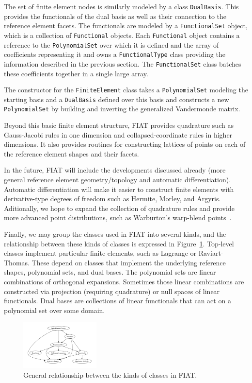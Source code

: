 The set of finite element nodes is similarly modeled by a class
\texttt{DualBasis}.  This provides the functionals of the dual basis
as well as their connection to the reference element facets.
The functionals are modeled by a \texttt{FunctionalSet} object, which
is a collection of \texttt{Functional} objects.
Each \texttt{Functional} object contains a
reference to the \texttt{PolynomialSet} over which it is defined and
the array of coefficients representing it and owns a
\texttt{FunctionalType} class providing the information described in
the previous section.  The
\texttt{FunctionalSet} class batches these coefficients together in a
single large array.

The constructor for the \texttt{FiniteElement} class takes a
\texttt{PolynomialSet} modeling the starting basis and a
\texttt{DualBasis} defined over this basis and constructs a new
\texttt{PolynomialSet} by building and inverting the generalized
Vandermonde matrix.

Beyond this basic finite element structure, FIAT provides quadrature
such as Gauss-Jacobi rules in one dimension and
collapsed-coordinate rules in higher dimensions.  It also provides
routines for constructing lattices of points on each of the reference
element shapes and their facets.

In the future, FIAT will include the developments discussed already
(more general reference element geometry/topology and automatic
differentiation).  Automatic differentiation will make it easier to
construct finite elements with deriva\-tive-type degrees of freedom such
as Hermite, Morley, and Argyris.  Aditionally,
we hope to expand the collection of quadrature
rules and provide more advanced point distributions, such as
Warburton's warp-blend points~\cite{War05}.

Finally, we may group the classes used in FIAT into several kinds, and
the relationship between these kinds of classes is expressed in Figure~\ref{fig:struct}.
Top-level classes implement particular finite elements, such as
Lagrange or Raviart-Thomas.  These depend on classes that implement
the underlying reference shapes, polynomial sets, and dual bases.  The
polynomial sets are linear combinations of orthogonal expansions.
Sometimes those linear combinations are constructed via projection
(requiring quadrature) or null spaces of linear functionals.
Dual bases are collections of linear functionals that can act on a
polynomial set over some domain.

\begin{figure}[h]
  \label{fig:struct}
  \begin{center}
    \includegraphics[width=4cm]{chapters/kirby-2/pdf/struct.pdf}
    \caption{General relationship between the kinds of classes in FIAT.}
  \end{center}
\end{figure}
